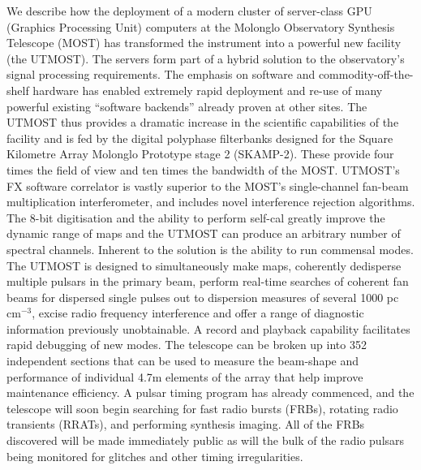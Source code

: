We describe how the deployment of a modern cluster of server-class GPU (Graphics Processing Unit) computers at the Molonglo Observatory Synthesis Telescope (MOST) has transformed the instrument into a powerful new facility (the UTMOST). The servers form part of a hybrid solution to the observatory's signal processing requirements. The emphasis on software and commodity-off-the-shelf hardware has enabled extremely rapid deployment and re-use of many powerful existing ``software backends'' already proven at other sites. The UTMOST thus provides a dramatic increase in the scientific capabilities of the facility and is fed by the digital polyphase filterbanks designed for the Square Kilometre Array Molonglo Prototype stage 2 (SKAMP-2). These provide four times the field of view and ten times the bandwidth of the MOST. UTMOST's FX software correlator is vastly superior to the MOST's single-channel fan-beam multiplication interferometer, and includes novel interference rejection algorithms. The 8-bit digitisation and the ability to perform self-cal greatly improve the dynamic range of maps and the UTMOST can produce an arbitrary number of spectral channels. Inherent to the solution is the ability to run commensal modes. The UTMOST is designed to simultaneously make maps, coherently dedisperse multiple pulsars in the primary beam, perform real-time searches of coherent fan beams for dispersed single pulses out to dispersion measures of several 1000 pc cm$^{-3}$, excise radio frequency interference and offer a range of diagnostic information previously unobtainable. A record and playback capability facilitates rapid debugging of new modes. The telescope can be broken up into 352 independent sections that can be used to measure the beam-shape and performance of individual 4.7m elements of the array that help improve maintenance efficiency. A pulsar timing program has already commenced, and the telescope will soon begin searching for fast radio bursts (FRBs), rotating radio transients (RRATs), and performing synthesis imaging. All of the FRBs discovered will be made immediately public as will the bulk of the radio pulsars being monitored for glitches and other timing irregularities. 
